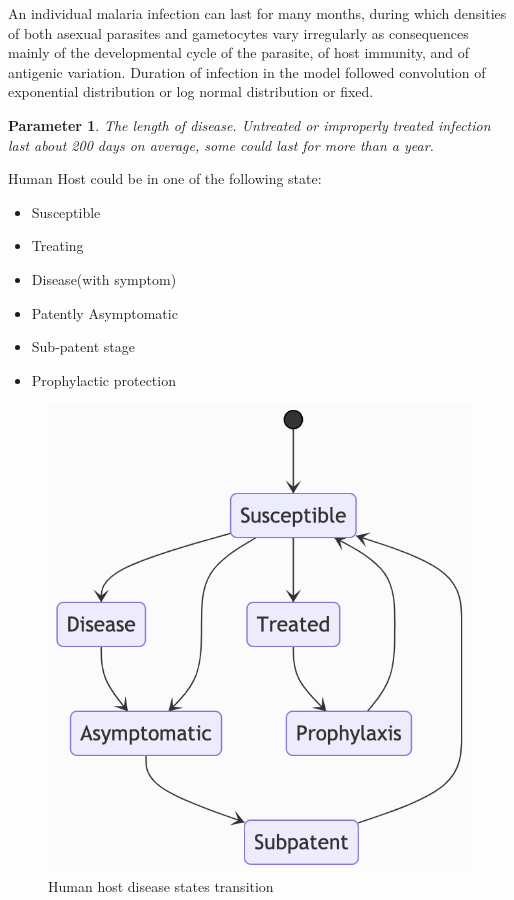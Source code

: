 \documentclass[a4paper, 12pt, twoside]{article}
\newtheorem{parameter}{Parameter}
\begin{document}
An individual malaria infection can last for many months, during which densities of both asexual parasites and gametocytes vary irregularly as consequences mainly of the developmental cycle of the parasite, of host immunity, and of antigenic variation.
Duration of infection in the model followed convolution of exponential distribution or log normal distribution or fixed.

\begin{parameter}
{The length of disease.}
{Untreated or improperly treated infection last about 200 days on average, some could last for more than a year.}
\end{parameter}

Human Host could be in one of the following state:
\begin{itemize}
	\item Susceptible
	\item Treating
	\item Disease(with symptom)
	\item Patently Asymptomatic
	\item Sub-patent stage
	\item Prophylactic protection
\end{itemize}

\begin{figure}[t]
	\centering
	\includegraphics[keepaspectratio=true, scale=0.8]{images/disease-state-transition-diagram.png}
	\caption{Human host disease states transition}
\end{figure}
\end{document}
